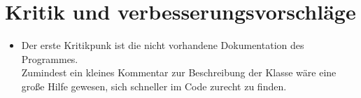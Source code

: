 \documentclass[a4paper]{article}
\begin{document}
\section{Kritik und verbesserungsvorschläge}
	\begin{itemize}
		\item Der erste Kritikpunk ist die nicht vorhandene Dokumentation des Programmes.\\
		Zumindest ein kleines Kommentar zur Beschreibung der Klasse wäre eine große Hilfe gewesen, sich schneller im Code zurecht zu finden.
		
	\end{itemize}

\newpage
{}

		
\end{document}
